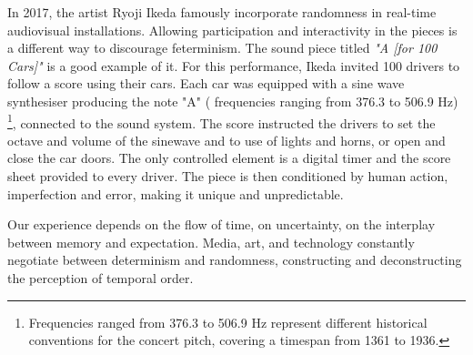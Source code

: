 In 2017, the artist Ryoji Ikeda famously incorporate randomness in real-time audiovisual installations. Allowing participation and interactivity in the pieces is a different way to discourage feterminism. The sound piece titled \textit{"A [for 100 Cars]"} is a good example of it. For this performance, Ikeda invited 100 drivers to follow a score using their cars. Each car was equipped with a sine wave synthesiser producing the note "A" ( frequencies ranging from 376.3 to 506.9 Hz) \footnote{Frequencies ranged from 376.3 to 506.9 Hz represent different historical conventions for the concert pitch, covering a timespan from 1361 to 1936.}, connected to the sound system. The score instructed the drivers to set the octave and volume of the sinewave and to use of lights and horns, or open and close the car doors. The only controlled element is a digital timer and the score sheet provided to every driver. The piece is then conditioned by human action, imperfection and error, making it unique and unpredictable. 

Our experience depends on the flow of time, on uncertainty, on the interplay between memory and expectation. Media, art, and technology constantly negotiate between determinism and randomness, constructing and deconstructing the perception of temporal order.



